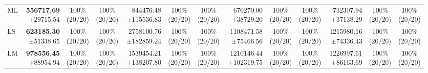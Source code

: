 \documentclass[10pt]{article}
\begin{document}
\begin{table}[!htbp]
\begin{tabular}{@{}l*{4}{rcc}@{}}
ML & \shortstack[r]{\textbf{556717.69}\\$\pm 29715.54$} & \shortstack[c]{100\%\\(20/20)} & \shortstack[c]{100\%\\(20/20)} & \shortstack[r]{844476.48\\$\pm 115536.83$} & \shortstack[c]{100\%\\(20/20)} & \shortstack[c]{100\%\\(20/20)} & \shortstack[r]{670270.00\\$\pm 38729.20$} & \shortstack[c]{100\%\\(20/20)} & \shortstack[c]{100\%\\(20/20)} & \shortstack[r]{732307.94\\$\pm 37138.29$} & \shortstack[c]{100\%\\(20/20)} & \shortstack[c]{100\%\\(20/20)} \\
LS & \shortstack[r]{\textbf{623185.30}\\$\pm 51338.65$} & \shortstack[c]{100\%\\(20/20)} & \shortstack[c]{100\%\\(20/20)} & \shortstack[r]{2758100.76\\$\pm 182859.24$} & \shortstack[c]{100\%\\(20/20)} & \shortstack[c]{100\%\\(20/20)} & \shortstack[r]{1108471.58\\$\pm 75466.56$} & \shortstack[c]{100\%\\(20/20)} & \shortstack[c]{100\%\\(20/20)} & \shortstack[r]{1215980.16\\$\pm 74336.43$} & \shortstack[c]{100\%\\(20/20)} & \shortstack[c]{100\%\\(20/20)} \\
LM & \shortstack[r]{\textbf{978556.45}\\$\pm 88954.94$} & \shortstack[c]{100\%\\(20/20)} & \shortstack[c]{100\%\\(20/20)} & \shortstack[r]{1539454.21\\$\pm 138207.80$} & \shortstack[c]{100\%\\(20/20)} & \shortstack[c]{100\%\\(20/20)} & \shortstack[r]{1210146.44\\$\pm 102319.75$} & \shortstack[c]{100\%\\(20/20)} & \shortstack[c]{100\%\\(20/20)} & \shortstack[r]{1226997.61\\$\pm 86163.69$} & \shortstack[c]{100\%\\(20/20)} & \shortstack[c]{100\%\\(20/20)} \\

\end{tabular}
\end{table}
\end{document}
